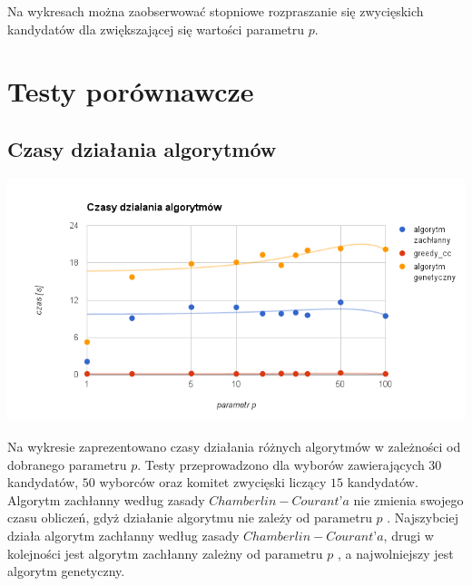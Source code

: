 \documentclass[polish,11pt]{aghthesis}
\begin{document}
Na wykresach można zaobserwować stopniowe rozpraszanie się zwycięskich kandydatów
dla zwiększającej się wartości parametru $p$.

\section{Testy porównawcze}
\subsection{Czasy działania algorytmów}
\begin{center}
\centerline{\includegraphics[scale=0.65]{pics/czas_dzialania.png}}
\end{center}
Na wykresie zaprezentowano czasy działania różnych algorytmów w zależności od
dobranego parametru $p$. Testy przeprowadzono dla wyborów zawierających $30$
kandydatów, $50$ wyborców oraz komitet zwycięski liczący $15$ kandydatów. Algorytm
zachłanny według zasady $Chamberlin-Courant’a$ nie zmienia swojego czasu obliczeń, gdyż działanie
algorytmu nie zależy od parametru $p$ . Najszybciej działa algorytm zachłanny według zasady
$Chamberlin-Courant’a$, drugi w kolejności jest algorytm zachłanny zależny od parametru $p$ , a najwolniejszy jest algorytm genetyczny.




\end{document}
